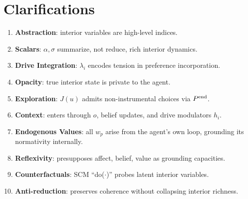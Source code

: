 \documentclass{article}
\begin{document}
\section{Clarifications}
\begin{enumerate}
  \item \textbf{Abstraction}: interior variables are high-level indices.
  \item \textbf{Scalars}: $\alpha,\sigma$ summarize, not reduce, rich interior dynamics.
  \item \textbf{Drive Integration}: $\lambda_i$ encodes tension in preference incorporation.
  \item \textbf{Opacity}: true interior state is private to the agent.
  \item \textbf{Exploration}: $J(u)$ admits non-instrumental choices via $P^{\rm end}$.
  \item \textbf{Context}: enters through $o$, belief updates, and drive modulators $h_i$.
  \item \textbf{Endogenous Values}: all $w_p$ arise from the agent's own loop, grounding its normativity internally.
  \item \textbf{Reflexivity}: presupposes affect, belief, value as grounding capacities.
  \item \textbf{Counterfactuals}: SCM ``do($\cdot$)'' probes latent interior variables.
  \item \textbf{Anti-reduction}: preserves coherence without collapsing interior richness.
\end{enumerate}
\end{document}
